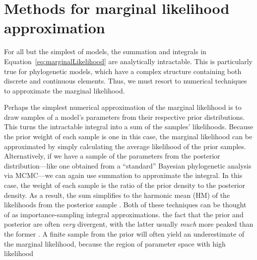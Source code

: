 \section{Methods for marginal likelihood approximation}

For all but the simplest of models, the summation and integrals in
Equation~\ref{eq:marginalLikelihood}
are analytically intractable.
This is particularly true for phylogenetic models, which have a complex
structure containing both discrete and continuous elements.
Thus, we must resort to numerical techniques to approximate the marginal
likelihood.

Perhaps the simplest numerical approximation of the marginal likelihood is to
draw samples of a model's parameters from their respective prior distributions.
This turns the intractable integral into a sum of the samples' likelihoods.
Because the prior weight of each sample is one in this case, the marginal
likelihood can be approximated by simply calculating the average likelihood of
the prior samples.
Alternatively, if we have a sample of the parameters from the posterior
distribution---like one obtained from a ``standard'' Bayesian phylogenetic
analysis via MCMC---we can again use summation to approximate the integral.
In this case, the weight of each sample is the ratio of the prior density to
the posterior density.
As a result, the sum simplifies to the harmonic mean (HM) of the likelihoods
from the posterior sample \citep{Newton1994}.
Both of these techniques can be thought of as importance-sampling integral
approximations.
the fact that the prior and posterior are often \emph{very} divergent,
with the latter usually \emph{much} more peaked than the former .
A finite sample from the prior will often yield an underestimate of the
marginal likelihood, because the region of parameter space with high likelihood
